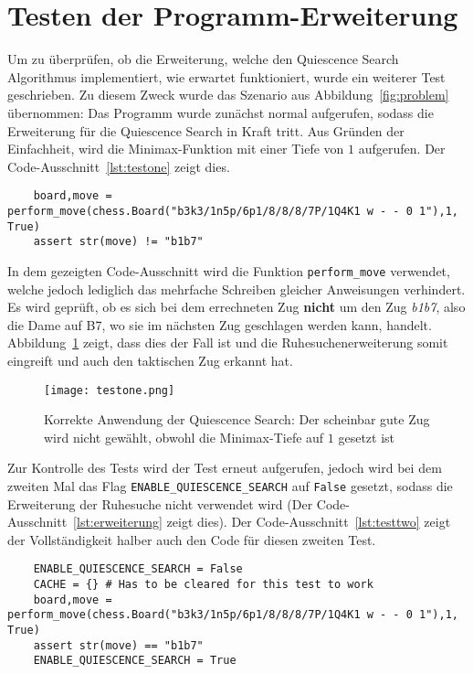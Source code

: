 \section{Testen der Programm-Erweiterung}
Um zu überprüfen, ob die Erweiterung, welche den Quiescence Search Algorithmus implementiert, wie erwartet funktioniert, wurde ein weiterer Test geschrieben. Zu diesem Zweck wurde das Szenario aus Abbildung~\ref{fig:problem} übernommen: Das Programm wurde zunächst normal aufgerufen, sodass die Erweiterung für die Quiescence Search in Kraft tritt. Aus Gründen der Einfachheit, wird die Minimax-Funktion mit einer Tiefe von $1$ aufgerufen. Der Code-Ausschnitt~\ref{lst:testone} zeigt dies.

\begin{lstlisting}[caption=Test für die Quiescence Search (normaler Aufruf), label=lst:testone]
	%%time
	board,move = perform_move(chess.Board("b3k3/1n5p/6p1/8/8/8/7P/1Q4K1 w - - 0 1"),1, True)
	assert str(move) != "b1b7"
\end{lstlisting}

In dem gezeigten Code-Ausschnitt wird die Funktion \texttt{perform\_move} verwendet, welche jedoch lediglich das mehrfache Schreiben gleicher Anweisungen verhindert. Es wird geprüft, ob es sich bei dem errechneten Zug \textbf{nicht} um den Zug \textit{b1b7}, also die Dame auf B7, wo sie im nächsten Zug geschlagen werden kann, handelt. Abbildung~\ref{fig:testone} zeigt, dass dies der Fall ist und die Ruhesuchenerweiterung somit eingreift und auch den taktischen Zug erkannt hat.

\begin{figure}[H]
	\texttt{[image: testone.png]}
	\caption{Korrekte Anwendung der Quiescence Search: Der scheinbar gute Zug wird nicht gewählt, obwohl die Minimax-Tiefe auf $1$ gesetzt ist}
	\label{fig:testone}
\end{figure}

Zur Kontrolle des Tests wird der Test erneut aufgerufen, jedoch wird bei dem zweiten Mal das Flag \texttt{ENABLE\_QUIESCENCE\_SEARCH} auf \texttt{False} gesetzt, sodass die Erweiterung der Ruhesuche nicht verwendet wird (Der Code-Ausschnitt~\ref{lst:erweiterung} zeigt dies). Der Code-Ausschnitt~\ref{lst:testtwo} zeigt der Vollständigkeit halber auch den Code für diesen zweiten Test.

\begin{lstlisting}[caption=Test für die Quiescence Search (Aufruf mit deaktivierter Ruhesuche), label=lst:testtwo]
	%%time
	ENABLE_QUIESCENCE_SEARCH = False
	CACHE = {} # Has to be cleared for this test to work
	board,move = perform_move(chess.Board("b3k3/1n5p/6p1/8/8/8/7P/1Q4K1 w - - 0 1"),1, True)
	assert str(move) == "b1b7"
	ENABLE_QUIESCENCE_SEARCH = True
\end{lstlisting}

